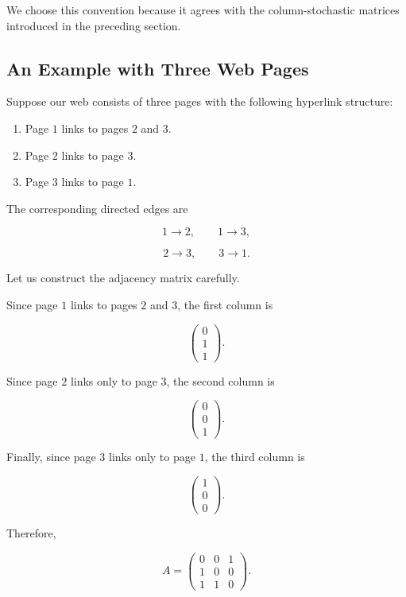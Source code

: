 \documentclass[11pt,a4paper]{article}
\theoremstyle{definition}
\theoremstyle{remark}
\begin{document}
We choose this convention
because it agrees with
the column-stochastic
matrices introduced
in the preceding section.


\subsection{An Example with Three Web Pages}

Suppose our web consists
of three pages with the
following hyperlink structure:

\begin{enumerate}

\item Page $1$ links to
pages $2$ and $3$.

\item Page $2$ links to
page $3$.

\item Page $3$ links to
page $1$.

\end{enumerate}

The corresponding directed
edges are

\[
1\longrightarrow2,
\qquad
1\longrightarrow3,
\]

\[
2\longrightarrow3,
\qquad
3\longrightarrow1.
\]

Let us construct the
adjacency matrix carefully.

Since page $1$ links to
pages $2$ and $3$,
the first column is

\[
\begin{pmatrix}
0\\1\\1
\end{pmatrix}.
\]

Since page $2$ links
only to page $3$,
the second column is

\[
\begin{pmatrix}
0\\0\\1
\end{pmatrix}.
\]

Finally, since page $3$
links only to page $1$,
the third column is

\[
\begin{pmatrix}
1\\0\\0
\end{pmatrix}.
\]

Therefore,

\begin{equation}
\boxed{
A=
\begin{pmatrix}
0&0&1\\
1&0&0\\
1&1&0
\end{pmatrix}.
}
\label{eq:pagerank_adjacency_example}
\end{equation}
\end{document}
